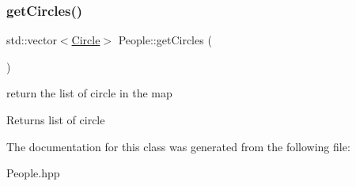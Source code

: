 \subsubsection{\texorpdfstring{get\+Circles()}{getCircles()}}
{\footnotesize\ttfamily std\+::vector$<$\mbox{\hyperlink{class_circle}{Circle}}$>$ People\+::get\+Circles (\begin{DoxyParamCaption}{ }\end{DoxyParamCaption})}

return the list of circle in the map \begin{DoxyReturn}{Returns}
list of circle 
\end{DoxyReturn}


The documentation for this class was generated from the following file\+:\begin{DoxyCompactItemize}
\item 
People.\+hpp\end{DoxyCompactItemize}
